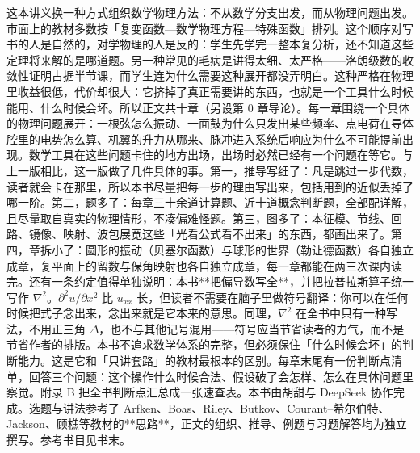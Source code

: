 这本讲义换一种方式组织数学物理方法：不从数学分支出发，而从物理问题出发。市面上的教材多数按「复变函数—数学物理方程—特殊函数」排列。这个顺序对写书的人是自然的，对学物理的人是反的：学生先学完一整本复分析，还不知道这些定理将来解的是哪道题。另一种常见的毛病是讲得太细、太严格——洛朗级数的收敛性证明占据半节课，而学生连为什么需要这种展开都没弄明白。这种严格在物理里收益很低，代价却很大：它挤掉了真正需要讲的东西，也就是一个工具什么时候能用、什么时候会坏。所以正文共十章（另设第 0 章导论）。每一章围绕一个具体的物理问题展开：一根弦怎么振动、一面鼓为什么只发出某些频率、点电荷在导体腔里的电势怎么算、机翼的升力从哪来、脉冲进入系统后响应为什么不可能提前出现。数学工具在这些问题卡住的地方出场，出场时必然已经有一个问题在等它。与上一版相比，这一版做了几件具体的事。第一，推导写细了：凡是跳过一步代数，读者就会卡在那里，所以本书尽量把每一步的理由写出来，包括用到的近似丢掉了哪一阶。第二，题多了：每章三十余道计算题、近十道概念判断题，全部配详解，且尽量取自真实的物理情形，不凑偏难怪题。第三，图多了：本征模、节线、回路、镜像、映射、波包展宽这些「光看公式看不出来」的东西，都画出来了。第四，章拆小了：圆形的振动（贝塞尔函数）与球形的世界（勒让德函数）各自独立成章，复平面上的留数与保角映射也各自独立成章，每一章都能在两三次课内读完。还有一条约定值得单独说明：本书**把偏导数写全**，并把拉普拉斯算子统一写作 $\nabla^2$。$\partial^2 u/\partial x^2$ 比 $u_{xx}$ 长，但读者不需要在脑子里做符号翻译：你可以在任何时候把式子念出来，念出来就是它本来的意思。同理，$\nabla^2$ 在全书中只有一种写法，不用正三角 $\Delta$，也不与其他记号混用——符号应当节省读者的力气，而不是节省作者的排版。本书不追求数学体系的完整，但必须保住「什么时候会坏」的判断能力。这是它和「只讲套路」的教材最根本的区别。每章末尾有一份判断点清单，回答三个问题：这个操作什么时候合法、假设破了会怎样、怎么在具体问题里察觉。附录 B 把全书判断点汇总成一张速查表。本书由胡甜与 DeepSeek 协作完成。选题与讲法参考了 Arfken、Boas、Riley、Butkov、Courant–希尔伯特、Jackson、顾樵等教材的**思路**，正文的组织、推导、例题与习题解答均为独立撰写。参考书目见书末。
